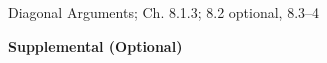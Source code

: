 \documentclass[handout]{mcs}
\begin{document}


\begin{staffnotes}
Diagonal Arguments; Ch. 8.1.3; 8.2 optional, 8.3--4
\end{staffnotes}




\begin{center}
\textbf{Supplemental (Optional)}
\end{center}











\end{document}
